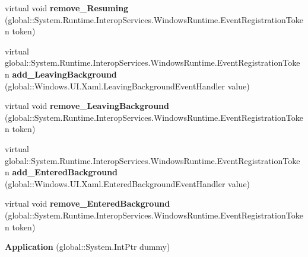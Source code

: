 \begin{DoxyCompactItemize}
\item 
\mbox{\label{class_windows_1_1_u_i_1_1_xaml_1_1_application_ae71f03dad163a08e042d3b65126ad419}} 
virtual void {\bfseries remove\+\_\+\+Resuming} (global\+::\+System.\+Runtime.\+Interop\+Services.\+Windows\+Runtime.\+Event\+Registration\+Token token)
\item 
\mbox{\label{class_windows_1_1_u_i_1_1_xaml_1_1_application_a652fc06a2f576820519f4a6302fa3a92}} 
virtual global\+::\+System.\+Runtime.\+Interop\+Services.\+Windows\+Runtime.\+Event\+Registration\+Token {\bfseries add\+\_\+\+Leaving\+Background} (global\+::\+Windows.\+U\+I.\+Xaml.\+Leaving\+Background\+Event\+Handler value)
\item 
\mbox{\label{class_windows_1_1_u_i_1_1_xaml_1_1_application_a33a3ccc165dd32a08e6cbc543ea18565}} 
virtual void {\bfseries remove\+\_\+\+Leaving\+Background} (global\+::\+System.\+Runtime.\+Interop\+Services.\+Windows\+Runtime.\+Event\+Registration\+Token token)
\item 
\mbox{\label{class_windows_1_1_u_i_1_1_xaml_1_1_application_a1ea6c3f747b180eb0e3d0485f1427ce1}} 
virtual global\+::\+System.\+Runtime.\+Interop\+Services.\+Windows\+Runtime.\+Event\+Registration\+Token {\bfseries add\+\_\+\+Entered\+Background} (global\+::\+Windows.\+U\+I.\+Xaml.\+Entered\+Background\+Event\+Handler value)
\item 
\mbox{\label{class_windows_1_1_u_i_1_1_xaml_1_1_application_a09062e367c18c1fcc02e683a68c8f793}} 
virtual void {\bfseries remove\+\_\+\+Entered\+Background} (global\+::\+System.\+Runtime.\+Interop\+Services.\+Windows\+Runtime.\+Event\+Registration\+Token token)
\item 
\mbox{\label{class_windows_1_1_u_i_1_1_xaml_1_1_application_a90eb3297ba9bfe5ad1c0d720af9b8066}} 
{\bfseries Application} (global\+::\+System.\+Int\+Ptr dummy)
\item 
\mbox{\label{class_windows_1_1_u_i_1_1_xaml_1_1_application_a34b9be50f5ce3d03d0f641d57ed74c72}} 

\end{DoxyCompactItemize}
